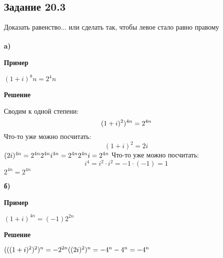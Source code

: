 \documentclass[12pt]{article}
\begin{document}
\newpage
\subsection{Задание 20.3}
Доказать равенство... или сделать так, чтобы левое стало равно правому\\
\\
\textbf{a)}\\
\begin{center}\textbf{Пример}\end{center}
$
(1+i)^8n=2^4n
$
\begin{center}\textbf{Решение}\end{center}
Сводим к одной степени:
$$
(1+i)^2)^{4n}=2^{4n}\\
$$
Что-то уже можно посчитать:
$$
(1+i)^2 = 2i
$$
$
(2i)^{4n}=2^{4n}\\
2^{4n}i^{4n}=2^{4n}\\
2^{4n}i=2^{4n} \\
$
Что-то уже можно посчитать:
$$
i^4=i^2\cdot i^2=-1\cdot(-1)=1
$$
$
2^{4n}=2^{4n}
$

\newpage
\textbf{б)}\\
\begin{center}\textbf{Пример}\end{center}
$
(1+i)^{4n}=(-1)2^{2n}
$
\begin{center}\textbf{Решение}\end{center}
$
(((1+i)^2)^2)^n=-2^{2n}\\
((2i)^2)^n=-4^n\\
-4^n=-4^n
$

\newpage
\end{document}
